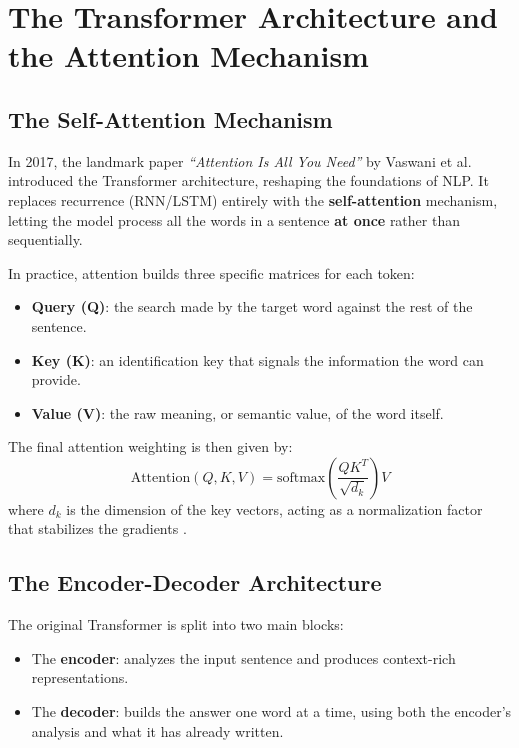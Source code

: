 \documentclass[12pt, a4paper]{report}
\newcommand{\sourced}[1]{#1}        %
\newcommand{\humantext}[1]{#1}      %
\begin{document}
\section{The Transformer Architecture and the Attention Mechanism}

\subsection{The Self-Attention Mechanism}
\sourced{In 2017, the landmark paper \textit{``Attention Is All You Need''} by Vaswani et al. \cite{vaswani2017attention} introduced the Transformer architecture, reshaping the foundations of NLP. It replaces recurrence (RNN/LSTM) entirely with the \textbf{self-attention} mechanism, letting the model process all the words in a sentence \textbf{at once} rather than sequentially.}

\humantext{In practice, attention builds three specific matrices for each token:}
\begin{itemize}[noitemsep]
    \item \humantext{\textbf{Query (Q)}: the search made by the target word against the rest of the sentence.}
    \item \humantext{\textbf{Key (K)}: an identification key that signals the information the word can provide.}
    \item \humantext{\textbf{Value (V)}: the raw meaning, or semantic value, of the word itself.}
\end{itemize}

\humantext{The final attention weighting is then given by:}
\begin{equation}
    \text{Attention}(Q, K, V) = \text{softmax}\left(\frac{QK^T}{\sqrt{d_k}}\right) V
\end{equation}
\sourced{where $d_k$ is the dimension of the key vectors, acting as a normalization factor that stabilizes the gradients \cite{vaswani2017attention}.}

\subsection{The Encoder-Decoder Architecture}
\humantext{The original Transformer is split into two main blocks:}
\begin{itemize}[noitemsep]
    \item \humantext{The \textbf{encoder}: analyzes the input sentence and produces context-rich representations.}
    \item \humantext{The \textbf{decoder}: builds the answer one word at a time, using both the encoder's analysis and what it has already written.}
\end{itemize}
\end{document}
